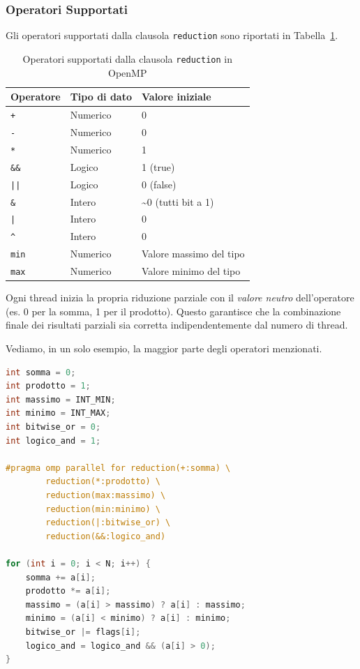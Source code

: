 \subsubsection{Operatori Supportati}
Gli operatori supportati dalla clausola \texttt{reduction} sono riportati in Tabella~\ref{tab:omp_reduction_ops}.

\begin{table}[h!]
\centering
\caption{Operatori supportati dalla clausola \texttt{reduction} in OpenMP}
\label{tab:omp_reduction_ops}
\begin{tabular}{lll}
\toprule
Operatore & Tipo di dato & Valore iniziale \\
\midrule
\texttt{+} & Numerico & 0 \\
\texttt{-} & Numerico & 0 \\
\texttt{*} & Numerico & 1 \\
\texttt{\&\&} & Logico & 1 (true) \\
\texttt{||} & Logico & 0 (false) \\
\texttt{\&} & Intero & \textasciitilde0 (tutti bit a 1) \\
\texttt{|} & Intero & 0 \\
\texttt{\^{}} & Intero & 0 \\
\texttt{min} & Numerico & Valore massimo del tipo \\
\texttt{max} & Numerico & Valore minimo del tipo \\
\bottomrule
\end{tabular}
\end{table}

Ogni thread inizia la propria riduzione parziale con il \emph{valore neutro} dell'operatore (es. 0 per la somma, 1 per il prodotto). Questo garantisce che la combinazione finale dei risultati parziali sia corretta indipendentemente dal numero di thread.

\begin{example}{}
    Vediamo, in un solo esempio, la maggior parte degli operatori menzionati.
    \begin{lstlisting}[language=C, numbers=none]
int somma = 0;
int prodotto = 1;
int massimo = INT_MIN;
int minimo = INT_MAX;
int bitwise_or = 0;
int logico_and = 1;

#pragma omp parallel for reduction(+:somma) \
        reduction(*:prodotto) \
        reduction(max:massimo) \
        reduction(min:minimo) \
        reduction(|:bitwise_or) \
        reduction(&&:logico_and)

for (int i = 0; i < N; i++) {
    somma += a[i];
    prodotto *= a[i];
    massimo = (a[i] > massimo) ? a[i] : massimo;
    minimo = (a[i] < minimo) ? a[i] : minimo;
    bitwise_or |= flags[i];
    logico_and = logico_and && (a[i] > 0);
}
    \end{lstlisting}
\end{example}

